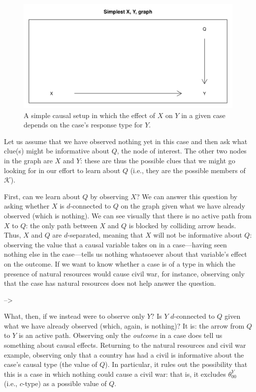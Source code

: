 \documentclass[
  12pt,
]{book}
\begin{document}
\begin{figure}

{\centering \includegraphics[width=.5\textwidth]{ii_files/figure-latex/sepsimple-1} 

}

\caption{A simple causal setup in which the effect of $X$ on $Y$ in a given case depends on the case's response type for $Y$.}\label{fig:sepsimple}
\end{figure}

Let us assume that we have observed nothing yet in this case and then ask what clue(s) might be informative about \(Q\), the node of interest. The other two nodes in the graph are \(X\) and \(Y\): these are thus the possible clues that we might go looking for in our effort to learn about \(Q\) (i.e., they are the possible members of \(\mathcal K\)).

First, can we learn about \(Q\) by observing \(X\)? We can answer this question by asking whether \(X\) is \(d\)-connected to \(Q\) on the graph given what we have already observed (which is nothing). We can see visually that there is no active path from \(X\) to \(Q\): the only path between \(X\) and \(Q\) is blocked by colliding arrow heads. Thus, \(X\) and \(Q\) are \(d\)-separated, meaning that \(X\) will not be informative about \(Q\): observing the value that a causal variable takes on in a case---having seen nothing else in the case---tells us nothing whatsoever about that variable's effect on the outcome. If we want to know whether a case is of a type in which the presence of natural resources would cause civil war, for instance, observing only that the case has natural resources does not help answer the question.

--\textgreater{}

What, then, if we instead were to observe only \(Y\)? Is \(Y\) \(d\)-connected to \(Q\) given what we have already observed (which, again, is nothing)? It is: the arrow from \(Q\) to \(Y\) is an active path. Observing only the \emph{outcome} in a case does tell us something about causal effects. Returning to the natural resources and civil war example, observing only that a country has had a civil is informative about the case's causal type (the value of \(Q\)). In particular, it rules out the possibility that this is a case in which nothing could cause a civil war: that is, it excludes \(\theta^Y_{00}\) (i.e., \(c\)-type) as a possible value of \(Q\).
\end{document}
